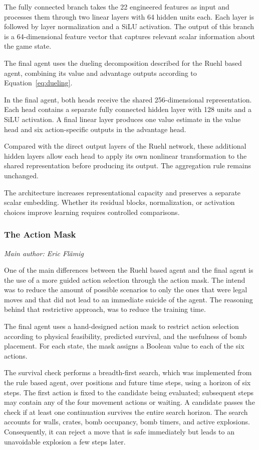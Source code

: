 \documentclass[11pt,a4paper]{article}
\newcommand{\contributionauthor}[1]{{\small\textit{Main author: #1}\par}}
\begin{document}
The fully connected branch takes the 22 engineered features as input and processes them through two linear layers with 64 hidden units each. Each layer is followed by layer normalization and a SiLU activation. The output of this branch is a 64-dimensional feature vector that captures relevant scalar information about the game state.

The final agent uses the dueling decomposition described for the
Ruehl based agent, combining its value and advantage outputs
according to Equation~\eqref{eq:dueling}.

In the final agent, both heads receive the shared 256-dimensional
representation. Each head contains a separate fully connected
hidden layer with 128 units and a SiLU activation. A final linear
layer produces one value estimate in the value head and six
action-specific outputs in the advantage head.

Compared with the direct output layers of the Ruehl network,
these additional hidden layers allow each head to apply its own
nonlinear transformation to the shared representation before
producing its output. The aggregation rule remains unchanged.

The architecture increases representational capacity and preserves a separate scalar embedding. Whether its residual blocks, normalization, or activation choices improve learning requires controlled comparisons. 

\subsubsection{The Action Mask}
\contributionauthor{Eric Flämig}
One of the main differences between the Ruehl based agent and the final agent is the use of a more guided action selection through the action mask. The intend was to reduce the amount of possible scenarios to only the ones that were legal moves and that did not lead to an immediate suicide of the agent. The reasoning behind that restrictive approach, was to reduce the training time.

The final agent uses a hand-designed action mask to restrict action
selection according to physical feasibility, predicted survival, and
the usefulness of bomb placement. For each state, the mask assigns
a Boolean value to each of the six actions.

The survival check performs a breadth-first search, which was implemented from the rule based agent, over positions and
future time steps, using a horizon of six steps. The first action is
fixed to the candidate being evaluated; subsequent steps may contain
any of the four movement actions or waiting. A candidate passes the
check if at least one continuation survives the entire search horizon.
The search accounts for walls, crates, bomb occupancy, bomb timers,
and active explosions. Consequently, it can reject a move that is
safe immediately but leads to an unavoidable explosion a few steps
later.
\end{document}
